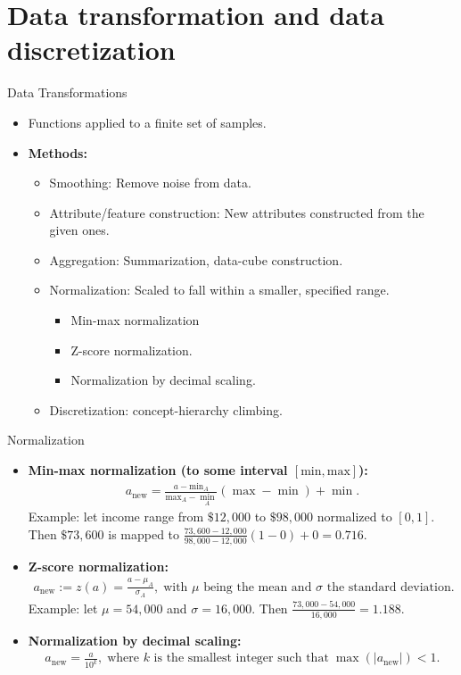 \section{Data transformation and data discretization}

\begin{frame}{Data Transformations}
	\begin{itemize}
		\item Functions applied to a finite set of samples.
		\item \textbf{Methods:}
		\begin{itemize}
			\item Smoothing: Remove noise from data.
			\item Attribute/feature construction: New attributes constructed 
			from the given ones.
			\item Aggregation: Summarization, data-cube construction.
			\item Normalization: Scaled to fall within a smaller, specified 
			range.
			\begin{itemize}
				\item Min-max normalization
				\item Z-score normalization.
				\item Normalization by decimal scaling.
			\end{itemize}
			\item Discretization: concept-hierarchy climbing.
		\end{itemize}
	\end{itemize}
\end{frame}

\begin{frame}{Normalization}
	\begin{itemize}
		\item \textbf{Min-max normalization (to some interval 
		$[\text{min},\text{max}]$):}
		\begin{align}
			a_{\text{new}} = \frac{a - \text{min}_A}{\text{max}_A-\min_{A}} 
			(\max - \min) + \min. 
		\end{align}
		Example: let income range from $\$12,000$ to $\$98,000$ normalized to 
		$[0,1]$.\\
		Then $\$73,600$ is mapped to $\frac{73,600-12,000}{98,000-12,000} (1-0) 
		+ 0 = 0.716$.
		\item \textbf{Z-score normalization:}
		\begin{align}
			a_{\text{new}} := z(a) = \frac{a-\mu_{A}}{\sigma_A}, \; \text{with 
			$\mu$ being the mean and $\sigma$ the standard deviation.} 
		\end{align}
		Example: let $\mu = 54,000$ and $\sigma = 16,000$. Then 
		$\frac{73,000-54,000}{16,000} = 1.188$.
		\item \textbf{Normalization by decimal scaling:}
		\begin{align}
			a_{\text{new}} = \frac{a}{10^k}, \; \text{where $k$ is the smallest 
			integer such that} \; \max(\vert a_{\text{new}} \vert) < 1. 
		\end{align}
	\end{itemize}
\end{frame}

